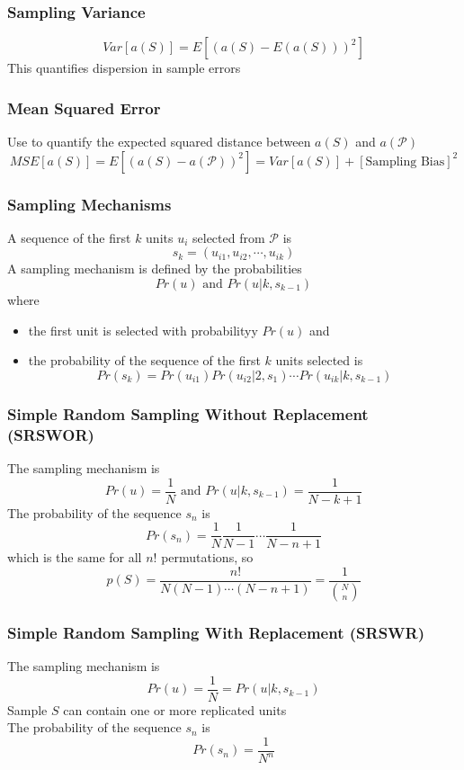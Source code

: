 \documentclass[11pt]{article}
\begin{document}
\subsubsection*{Sampling Variance}
\[Var[a(S)] = E[(a(S)-E(a(S)))^2] \]    
This quantifies dispersion in sample errors
\subsubsection*{Mean Squared Error}
Use to quantify the expected squared distance between $a(S)$ and $a(\mathcal{P})$ 
\[MSE[a(S)] = E[(a(S)-a(\mathcal{P}))^2] = Var[a(S)] + [\text{Sampling Bias}]^2\]    
\subsubsection{Sampling Mechanisms}
A sequence of the first $k$ units $u_i$ selected from $\mathcal{P}$ is 
\[s_k = (u_{i1},u_{i2},\cdots,u_{ik})\]
A sampling mechanism is defined by the probabilities 
\[Pr(u)\text{ and } Pr(u|k,s_{k-1})\]
where 
\begin{itemize}
    \item the first unit is selected with probabilityy $Pr(u)$ and 
    \item the probability of the sequence of the first $k$ units selected is 
    \[Pr(s_k) = Pr(u_{i1})Pr(u_{i2}|2,s_{1})\cdots Pr(u_{ik}|k,s_{k-1})\]
\end{itemize}
\subsubsection*{Simple Random Sampling Without Replacement (SRSWOR)}
The sampling mechanism is \[Pr(u) = \frac{1}{N} \text{ and } Pr(u|k,s_{k-1}) = \frac{1}{N-k+1}\]
The probability of the sequence $s_n$ is 
\[Pr(s_n) = \frac{1}{N}\frac{1}{N-1}\cdots\frac{1}{N-n+1} \]    
which is the same for all $n!$ permutations, so 
\[p(S) = \frac{n!}{N(N-1)\cdots(N-n+1)} = \frac{1}{{N\choose n}}\]
\subsubsection*{Simple Random Sampling With Replacement (SRSWR)}
The sampling mechanism is 
\[Pr(u) = \frac{1}{N} = Pr(u|k,s_{k-1})\]
Sample $S$ can contain one or more replicated units \\
The probability of the sequence $s_n$ is 
\[Pr(s_n) = \frac{1}{N^n}\]
\end{document}
